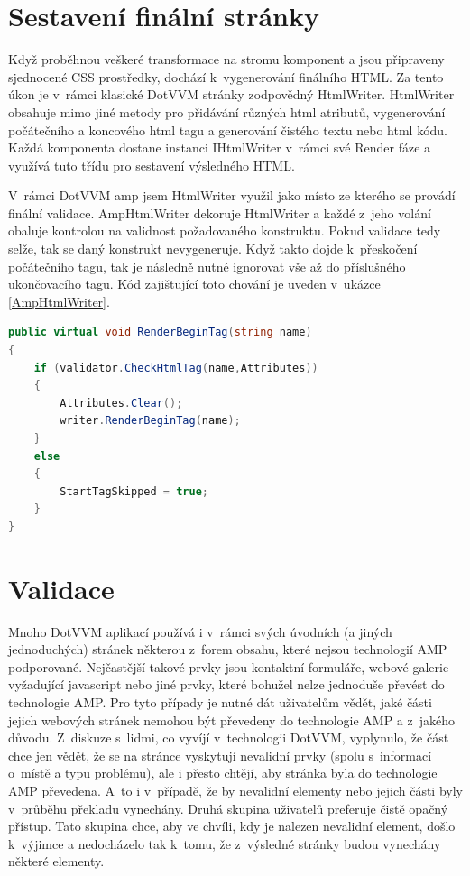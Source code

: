 \section{Sestavení finální stránky}
Když proběhnou veškeré transformace na stromu komponent a jsou připraveny sjednocené CSS prostředky, dochází k~vygenerování finálního HTML. Za tento úkon je v~rámci klasické DotVVM stránky zodpovědný HtmlWriter. HtmlWriter obsahuje mimo jiné metody pro přidávání různých html atributů, vygenerování počátečního a koncového html tagu a generování čistého textu nebo html kódu. Každá komponenta dostane instanci IHtmlWriter v~rámci své Render fáze a využívá tuto třídu pro sestavení výsledného HTML.

V~rámci DotVVM amp jsem HtmlWriter využil jako místo ze kterého se provádí finální validace. AmpHtmlWriter dekoruje HtmlWriter a každé z~jeho volání obaluje kontrolou na validnost požadovaného konstruktu. Pokud validace tedy selže, tak se daný konstrukt nevygeneruje. Když takto dojde k~přeskočení počátečního tagu, tak je následně nutné ignorovat vše až do příslušného ukončovacího tagu. Kód zajištující toto chování je uveden v~ukázce \ref{AmpHtmlWriter}.


\begin{lstlisting}[language=c#, caption=Metoda RenderBeginTag na třídě AmpHtmlWriter ,label=AmpHtmlWriter,captionpos=t]
public virtual void RenderBeginTag(string name)
{
    if (validator.CheckHtmlTag(name,Attributes))
    {
        Attributes.Clear();
        writer.RenderBeginTag(name);
    }
    else
    {
        StartTagSkipped = true;
    }
}
\end{lstlisting}

\section{Validace}
Mnoho DotVVM aplikací používá i v~rámci svých úvodních (a jiných jednoduchých) stránek některou z~forem obsahu, které nejsou technologií AMP podporované. Nejčastější takové prvky jsou kontaktní formuláře, webové galerie vyžadující javascript nebo jiné prvky, které bohužel nelze jednoduše převést do technologie AMP.
Pro tyto případy je nutné dát uživatelům vědět, jaké části jejich webových stránek nemohou být převedeny do technologie AMP a z~jakého důvodu. Z~diskuze s~lidmi, co vyvíjí v~technologii DotVVM, vyplynulo, že část chce jen vědět, že se na stránce vyskytují nevalidní prvky (spolu s~informací o~místě a typu problému), ale i přesto chtějí, aby stránka byla do technologie AMP převedena. A~to i v~případě, že by nevalidní elementy nebo jejich části byly v~průběhu překladu vynechány. Druhá skupina uživatelů preferuje čistě opačný přístup. Tato skupina chce, aby ve chvíli, kdy je nalezen nevalidní element, došlo k~výjimce a nedocházelo tak k~tomu, že z~výsledné stránky budou vynechány některé elementy.


